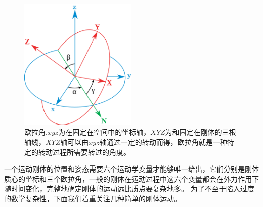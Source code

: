\begin{figure}[hbtp]

\centering
\includegraphics[width=0.5\textwidth]{images/rb-Eulerangles.pdf}
\caption{欧拉角,$xyz$为在固定在空间中的坐标轴，$XYZ$为和固定在刚体的三根轴线，$XYZ$轴可以由$xyz$轴通过一定的转动而得，欧拉角就是一种特定的转动过程所需要转过的角度。}\label{fig: rg-euler-angle}
\end{figure}





一个运动刚体的位置和姿态需要六个运动学变量才能够唯一给出，它们分别是刚体质心的坐标和三个欧拉角，一般的刚体在运动过程中这六个变量都会在外力作用下随时间变化，完整地确定刚体的运动远比质点要复杂地多。
为了不至于陷入过度的数学复杂性，下面我们着重关注几种简单的刚体运动。

